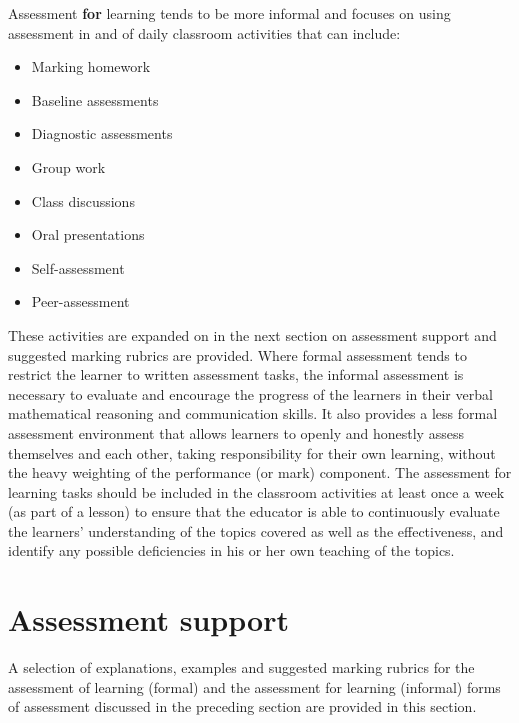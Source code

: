 Assessment \textbf{for} learning tends to be more informal and focuses on using assessment in and of daily classroom activities that can include: 
\begin{itemize}[noitemsep]
\item Marking homework
\item Baseline assessments
\item Diagnostic assessments
\item Group work
\item Class discussions
\item Oral presentations
\item Self-assessment
\item Peer-assessment
\end{itemize}
These activities are expanded on in the next section on assessment support and suggested marking rubrics are provided. Where formal assessment tends to restrict the learner to written assessment tasks, the informal assessment is necessary to evaluate and encourage the progress of the learners in their verbal mathematical reasoning and communication skills. It also provides a less formal assessment environment that allows learners to openly and honestly assess themselves and each other, taking responsibility for their own learning, without the heavy weighting of the performance (or mark) component. The assessment for learning tasks should be included in the classroom activities at least once a week (as part of a lesson) to ensure that the educator is able to continuously evaluate the learners’ understanding of the topics covered as well as the effectiveness, and identify any possible deficiencies in his or her own teaching of the topics. 

\section{Assessment support}
A selection of explanations, examples and suggested marking rubrics for the assessment of learning (formal) and the assessment for learning (informal) forms of assessment discussed in the preceding section are provided in this section. 
